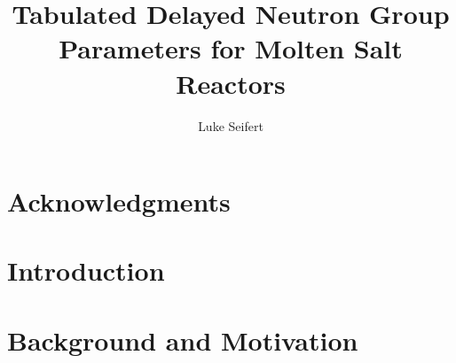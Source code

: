 \documentclass[edeposit,fullpage,hidelinks]{uiucthesis2018}
\title{Tabulated Delayed Neutron Group Parameters for Molten Salt Reactors}
\author{Luke Seifert}
\begin{document}
\maketitle

\frontmatter
\begin{abstract}



\end{abstract}

\chapter*{Acknowledgments}




\tableofcontents
\listoftables
\listoffigures


\pagebreak
\mainmatter

\chapter{Introduction}



\chapter{Background and Motivation}

\end{document}
